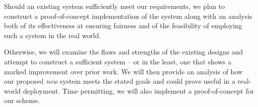 \documentclass[9pt]{article}
\begin{document}
		Should an existing system sufficiently meet our requirements, we plan to construct a
		proof-of-concept implementation of the system along with an analysis both of its effectiveness
		at ensuring fairness and of the feasibility of employing such a system in the real world.

		Otherwise, we will examine the flaws and strengths of the existing designs and attempt to
		construct a sufficient system -- or in the least, one that shows a marked improvement over
		prior work. We will then provide an analysis of how our proposed \emph{new} system meets the
		stated goals and could prove useful in a real-world deployment. Time permitting, we will also
		implement a proof-of-concept for our scheme.

	{}
	
\end{document}
